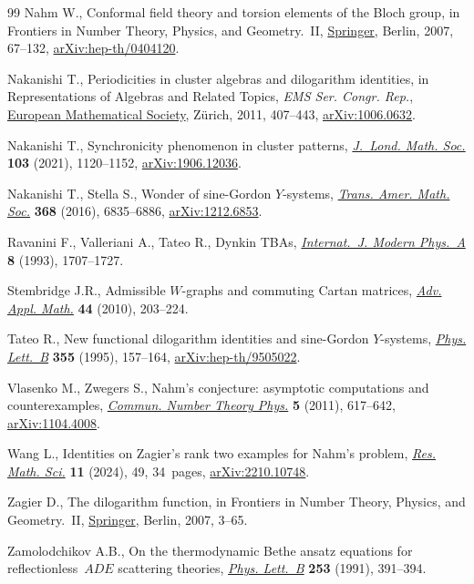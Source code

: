 \begin{thebibliography}{99}
Nahm W., Conformal field theory and torsion elements of the {B}loch group, in
 Frontiers in {N}umber {T}heory, {P}hysics, and {G}eometry.~{II},
 \href{https://doi.org/10.1007/978-3-540-30308-4_2}{Springer}, Berlin, 2007,
 67--132, \href{http://arxiv.org/abs/hep-th/0404120}{arXiv:hep-th/0404120}.

Nakanishi T., Periodicities in cluster algebras and dilogarithm identities, in
 Representations of {A}lgebras and {R}elated {T}opics, \textit{EMS Ser. Congr. Rep.},
 \href{https://doi.org/10.4171/101-1/9}{European Mathematical Society},
 Z\"urich, 2011, 407--443,
 \href{http://arxiv.org/abs/1006.0632}{arXiv:1006.0632}.

Nakanishi T., Synchronicity phenomenon in cluster patterns,
 \href{https://doi.org/10.1112/jlms.12402}{\textit{J.~Lond. Math. Soc.}}
 \textbf{103} (2021), 1120--1152,
 \href{http://arxiv.org/abs/1906.12036}{arXiv:1906.12036}.

Nakanishi T., Stella S., Wonder of sine-{G}ordon {$Y$}-systems,
 \href{https://doi.org/10.1090/tran/6505}{\textit{Trans. Amer. Math. Soc.}}
 \textbf{368} (2016), 6835--6886,
 \href{http://arxiv.org/abs/1212.6853}{arXiv:1212.6853}.

Ravanini F., Valleriani A., Tateo R., Dynkin {TBA}s,
 \href{https://doi.org/10.1142/S0217751X93000709}{\textit{Internat.~J. Modern
 Phys.~A}} \textbf{8} (1993), 1707--1727.

Stembridge J.R., Admissible {$W$}-graphs and commuting {C}artan matrices,
 \href{https://doi.org/10.1016/j.aam.2009.08.001}{\textit{Adv. Appl. Math.}}
 \textbf{44} (2010), 203--224.

Tateo R., New functional dilogarithm identities and sine-{G}ordon
 {$Y$}-systems,
 \href{https://doi.org/10.1016/0370-2693(95)00751-6}{\textit{Phys. Lett.~B}}
 \textbf{355} (1995), 157--164,
 \href{http://arxiv.org/abs/hep-th/9505022}{arXiv:hep-th/9505022}.

Vlasenko M., Zwegers S., Nahm's conjecture: asymptotic computations and
 counterexamples,
 \href{https://doi.org/10.4310/CNTP.2011.v5.n3.a2}{\textit{Commun. Number
 Theory Phys.}} \textbf{5} (2011), 617--642,
 \href{http://arxiv.org/abs/1104.4008}{arXiv:1104.4008}.

Wang L., Identities on {Z}agier's rank two examples for {N}ahm's problem,
 \href{https://doi.org/10.1007/s40687-024-00460-z}{\textit{Res. Math. Sci.}}
 \textbf{11} (2024), 49, 34~pages,
 \href{http://arxiv.org/abs/2210.10748}{arXiv:2210.10748}.

Zagier D., The dilogarithm function, in Frontiers in {N}umber {T}heory,
 {P}hysics, and {G}eometry.~{II},
 \href{https://doi.org/10.1007/978-3-540-30308-4_1}{Springer}, Berlin, 2007,
 3--65.

Zamolodchikov A.B., On the thermodynamic {B}ethe ansatz equations for
 reflectionless~{$ADE$} scattering theories,
 \href{https://doi.org/10.1016/0370-2693(91)91737-G}{\textit{Phys. Lett.~B}}
 \textbf{253} (1991), 391--394.

\end{thebibliography}
